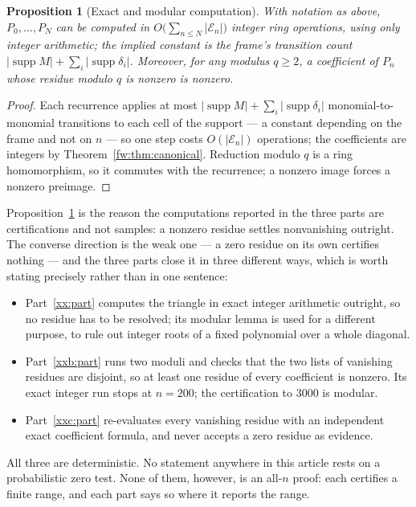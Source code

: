 \documentclass[11pt,a4paper]{article}
\numberwithin{equation}{section}
\newtheorem{proposition}[theorem]{Proposition}
\theoremstyle{definition}
\theoremstyle{remark}
\theoremstyle{plain}
\DeclareMathOperator{\supp}{supp}
\begin{document}
\begin{proposition}[Exact and modular computation]\label{fw:prop:computation}
With notation as above, $P_0,\dots,P_N$ can be computed in
$O\bigl(\sum_{n\le N}|\mathcal E_n|\bigr)$ integer ring operations, using only
integer arithmetic; the implied constant is the frame's transition count
$|\supp M|+\sum_i|\supp\delta_i|$.  Moreover, for any modulus $q\ge2$, a
coefficient of $P_n$ whose residue modulo $q$ is nonzero is nonzero.
\end{proposition}

\begin{proof}
Each recurrence applies at most $|\supp M|+\sum_i|\supp\delta_i|$
monomial-to-monomial transitions to each cell of the support --- a constant
depending on the frame and not on $n$ --- so one step costs $O(|\mathcal E_n|)$
operations; the coefficients are integers by
Theorem~\ref{fw:thm:canonical}.  Reduction modulo $q$ is a ring homomorphism, so
it commutes with the recurrence; a nonzero image forces a nonzero preimage.
\end{proof}

Proposition~\ref{fw:prop:computation} is the reason the computations reported in
the three parts are certifications and not samples: a nonzero residue settles
nonvanishing outright.  The converse direction is the weak one --- a zero
residue on its own certifies nothing --- and the three parts close it in three
different ways, which is worth stating precisely rather than in one sentence:

\begin{itemize}[leftmargin=1.6em,itemsep=2pt]
\item Part~\ref{xx:part} computes the triangle in exact integer arithmetic
 outright, so no residue has to be resolved; its modular lemma is used for a
 different purpose, to rule out integer roots of a fixed polynomial over a whole
 diagonal.
\item Part~\ref{xxb:part} runs two moduli and checks that the two lists of
 vanishing residues are disjoint, so at least one residue of every coefficient
 is nonzero.  Its exact integer run stops at $n=200$; the certification to
 $3000$ is modular.
\item Part~\ref{xxc:part} re-evaluates every vanishing residue with an
 independent exact coefficient formula, and never accepts a zero residue as
 evidence.
\end{itemize}

\noindent
All three are deterministic.  No statement anywhere in this article rests on a
probabilistic zero test.  None of them, however, is an all-$n$ proof: each
certifies a finite range, and each part says so where it reports the range.
\end{document}
